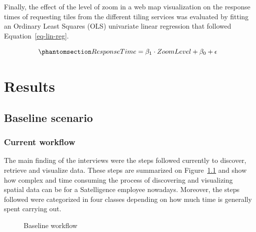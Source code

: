 \documentclass[
  oneside,
  open=any]{scrbook}
\begin{document}
Finally, the effect of the level of zoom in a web map visualization on
the response times of requesting tiles from the different tiling
services was evaluated by fitting an Ordinary Least Squares (OLS)
univariate linear regression that followed Equation~\ref{eq-lin-reg}.

\begin{equation}\phantomsection\label{eq-lin-reg}{ ResponseTime = \beta_1 \cdot ZoomLevel + \beta_0 + \epsilon }\end{equation}

\chapter{Results}\label{results}

\section{Baseline scenario}\label{baseline-scenario-1}

\subsection{Current workflow}\label{current-workflow}

The main finding of the interviews were the steps followed currently to
discover, retrieve and visualize data. These steps are summarized on
Figure~\ref{fig-baseline} and show how complex and time consuming the
process of discovering and visualizing spatial data can be for a
Satelligence employee nowadays. Moreover, the steps followed were
categorized in four classes depending on how much time is generally
spent carrying out.

\begin{figure}[H]


\caption{\label{fig-baseline}Baseline workflow}

\end{figure}%
\end{document}
